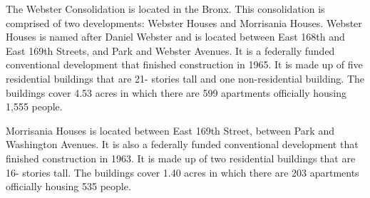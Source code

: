 The Webster Consolidation is located in the Bronx. This consolidation is comprised of two developments: Webster Houses and Morrisania Houses. Webster Houses is named after Daniel Webster and is located between East 168th and East 169th Streets, and Park and Webster Avenues. It is a federally funded conventional development that finished construction in 1965. It is made up of five residential buildings that are 21- stories tall and one non-residential building. The buildings cover 4.53 acres in which there are 599 apartments officially housing 1,555 people.  \par \vspace{.7\baselineskip}Morrisania Houses is located between East 169th Street, between Park and Washington Avenues. It is also a federally funded conventional development that finished construction in 1963.  It is made up of two residential buildings that are 16- stories tall. The buildings cover 1.40 acres in which there are 203 apartments officially housing 535 people.